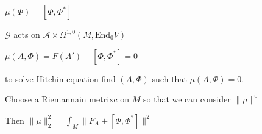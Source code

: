 $ \mu(\Phi ) = [ \Phi , \Phi ^* ] $ 

$ \mathcal{G} $ acts on $ \mathcal{A} \times \Omega^{1,0} (M , \mathrm{End}_0 V ) $ 

$ \mu( A, \Phi) = F ( A') + [\Phi , \Phi ^* ] = 0 $ 

to solve Hitchin equation find $(A, \Phi) $ such that $ \mu( A, \Phi) = 0 $. 

Choose a Riemannain metrixc on $M$ so that we can consider $ \| \mu \| ^0 $ 

Then $ \| \mu \|_2 ^ 2 = \int _M \| F_A + [\Phi , \Phi^* ] \| ^2 $ 











 

